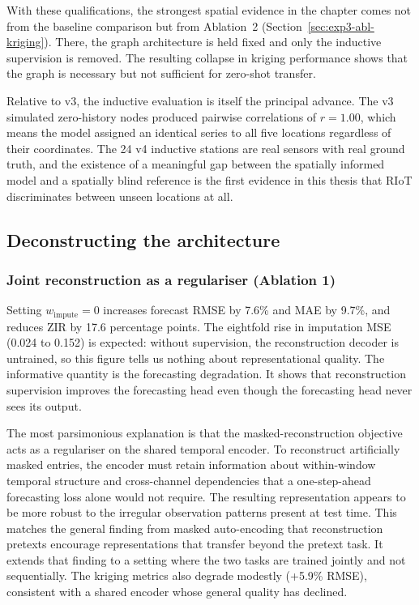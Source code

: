 With these qualifications, the strongest spatial evidence in the chapter
comes not from the baseline comparison but from Ablation~2
(Section~\ref{sec:exp3-abl-kriging}). There, the graph architecture is
held fixed and only the inductive supervision is removed. The resulting
collapse in kriging performance shows that the graph is necessary but
not sufficient for zero-shot transfer.

Relative to v3, the inductive evaluation is itself the principal
advance. The v3 simulated zero-history nodes produced pairwise
correlations of $r = 1.00$, which means the model assigned an identical
series to all five locations regardless of their coordinates. The 24 v4
inductive stations are real sensors with real ground truth, and the
existence of a meaningful gap between the spatially informed model and a
spatially blind reference is the first evidence in this thesis that RIoT
discriminates between unseen locations at all.

\subsection{Deconstructing the architecture}
\label{sec:exp3-ablations}

\subsubsection{Joint reconstruction as a regulariser (Ablation 1)}
\label{sec:exp3-abl-impute}

Setting $w_{\text{impute}} = 0$ increases forecast RMSE by 7.6\% and MAE
by 9.7\%, and reduces ZIR by 17.6 percentage points. The
eightfold rise in imputation MSE (0.024 to 0.152) is expected: without
supervision, the reconstruction decoder is untrained, so this figure
tells us nothing about representational quality. The informative
quantity is the forecasting degradation. It shows that reconstruction
supervision improves the forecasting head even though the forecasting
head never sees its output.

The most parsimonious explanation is that the masked-reconstruction
objective acts as a regulariser on the shared temporal encoder. To
reconstruct artificially masked entries, the encoder must retain
information about within-window temporal structure and cross-channel
dependencies that a one-step-ahead forecasting loss alone would not
require. The resulting representation appears to be more robust to the
irregular observation patterns present at test time. This matches the
general finding from masked auto-encoding that reconstruction pretexts
encourage representations that transfer beyond the pretext task. It
extends that finding to a setting where the two tasks are trained
jointly and not sequentially. The kriging metrics also degrade modestly
(+5.9\% RMSE), consistent with a shared encoder whose general quality
has declined.


